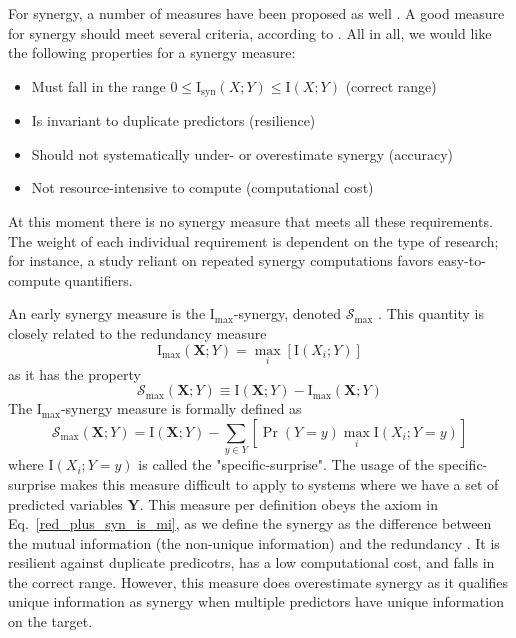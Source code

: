 \documentclass[../main.tex]{subfiles}
\begin{document}
For synergy, a number of measures have been proposed as well \cite{griffith2014quantifying, olbrich2015information}.
A good measure for synergy should meet several criteria, according to \cite{griffith2014quantifying}.
All in all, we would like the following properties for a synergy measure:
%
\begin{itemize}
\item Must fall in the range $0 \le \mathrm{I}_\mathrm{syn}\left( X;Y \right) \le \mathrm{I} \left( X;Y \right)$ (correct range)
\item Is invariant to duplicate predictors (resilience)
\item Should not systematically under- or overestimate synergy (accuracy)
\item Not resource-intensive to compute (computational cost)
\end{itemize}
%
At this moment there is no synergy measure that meets all these requirements.
The weight of each individual requirement is dependent on the type of research; for instance, a study reliant on repeated synergy computations favors easy-to-compute quantifiers.

An early synergy measure is the $\mathrm{I}_\mathrm{max}$-synergy, denoted $\mathcal{S}_\mathrm{max}$ \cite{williams2010nonnegative}.
This quantity is closely related to the redundancy measure
%
\begin{equation}
\mathrm{I}_\mathrm{max} \left( \mathbf{X};Y \right) = \max_i [\mathrm{I} \left( X_{i};Y \right)]
\end{equation}
%
as it has the property
%
\begin{equation}
\mathcal{S}_\mathrm{max} \left( \mathbf{X};Y \right) \equiv \mathrm{I} \left( \mathbf{X};Y \right) - \mathrm{I}_\mathrm{max} \left( \mathbf{X};Y \right)
\end{equation}
%
The $\mathrm{I}_\mathrm{max}$-synergy measure is formally defined as
%
\begin{equation}
\mathcal{S}_\mathrm{max} \left( \mathbf{X};Y \right) = \mathrm{I} \left( \mathbf{X};Y \right) - \sum_{y \in Y} [ \Pr \left( Y = y \right) \max_i \mathrm{I} \left( X_i ; Y = y \right) ]
\end{equation}
%
where $\mathrm{I} \left( X_i ; Y = y \right)$ is called the "specific-surprise".
The usage of the specific-surprise makes this measure difficult to apply to systems where we have a set of predicted variables $\mathbf{Y}$.
This measure per definition obeys the axiom in Eq.~\ref{red_plus_syn_is_mi}, as we define the synergy as the difference between the mutual information (the non-unique information) and the redundancy \cite{griffith2014quantifying}.
It is resilient against duplicate predicotrs, has a low computational cost, and falls in the correct range.
However, this measure does overestimate synergy as it qualifies unique information as synergy when multiple predictors have unique information on the target.
\end{document}
